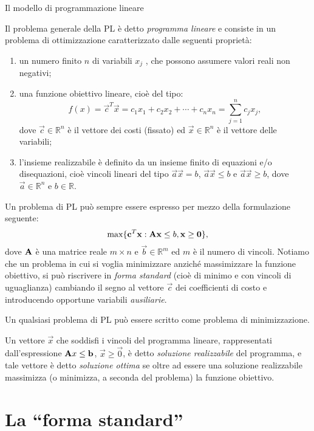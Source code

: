 \documentclass{beamer}
\begin{document}
\begin{frame}[allowframebreaks]{Il modello di programmazione lineare}

Il problema generale della PL è detto \emph{programma lineare} e consiste
in un problema di ottimizzazione caratterizzato dalle seguenti proprietà:
\begin{enumerate}
\item un numero finito $n$ di variabili $x_{j}$ , che possono assumere
valori reali non negativi;
\item una funzione obiettivo lineare, cioè del tipo: 
\[
f(x)=\vec{c}^{T}\vec{x}=c_{1}x_{1}+c_{2}x_{2}+\cdots+c_{n}x_{n}=\sum_{j=1}^{n}c_{j}x_{j},
\]
dove $\vec{c}\in\mathbb{R}^{n}$ è il vettore dei costi (fissato) ed $\vec{x}\in\mathbb{R}^{n}$
è il vettore delle variabili;
\item l'insieme realizzabile è definito da un insieme finito di equazioni
e/o disequazioni, cioè vincoli lineari del tipo $\vec{a}\vec{x}=b$, $\vec{a}\vec{x}\leq b$
e $\vec{a}\vec{x}\geq b$, dove $\vec{a}\in\mathbb{R}^{n}$ e $b\in\mathbb{R}$.
\end{enumerate}
Un problema di PL può sempre essere espresso per mezzo della formulazione
seguente: 
\[
\max\{\mathbf{c}^{T}\mathbf{x}:\mathbf{A}\mathbf{x}\leq b,\mathbf{x}\geq\mathbf{0}\},
\]
dove $\mathbf{A}$ è una matrice reale $m\times n$ e $\vec{b}\in\mathbb{R}^{m}$
ed $m$ è il numero di vincoli. Notiamo che un problema in cui
si voglia minimizzare anziché massimizzare la funzione obiettivo,
si può riscrivere in \emph{forma standard} (cioè di minimo
e con vincoli di uguaglianza)
cambiando il segno al vettore $\vec{c}$ dei coefficienti di costo
e introducendo opportune variabili \emph{ausiliarie}.

\framebreak

Un qualsiasi problema di PL può essere scritto come problema
di minimizzazione.

Un vettore $\vec{x}$ che soddisfi i vincoli del programma lineare, rappresentati
dall'espressione $\mathbf{A}x\leq \mathbf{b}$, $\vec{x}\geq\vec{0}$, è detto \emph{soluzione realizzabile}
del programma, e tale vettore è detto \emph{soluzione ottima} se oltre
ad essere una soluzione realizzabile massimizza (o minimizza, a seconda
del problema) la funzione obiettivo.
\end{frame}

\section{La ``forma standard''}
\end{document}
